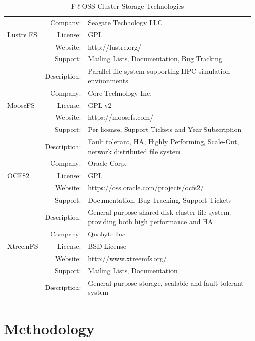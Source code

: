 \documentclass[a4paper, 12pt]{book}
\begin{document}
\begin{table}[H]
  \centering
  \begin{tabular}{ | m{2cm} | r  m{10cm} | }
 
     \hline
		& Company: & Seagate Technology LLC \\
      Lustre FS	& License: & GPL \\
		& Website: & http://lustre.org/ \\
		& Support: & Mailing Lists, Documentation, Bug Tracking \\
	 	& Description: & Parallel file system supporting HPC simulation environments \\

    \hline
		& Company: & Core Technology Inc. \\
      MooseFS	& License: & GPL v2 \\
		& Website: & https://moosefs.com/ \\
		& Support: & Per license, Support Tickets and Year Subscription\\
	 	& Description: & Fault tolerant, HA, Highly Performing, Scale-Out, network distributed file system \\

    \hline
		& Company: & Oracle Corp. \\
      	OCFS2	& License: & GPL \\
		& Website: & https://oss.oracle.com/projects/ocfs2/ \\
		& Support: & Documentation, Bug Tracking, Support Tickets \\
	 	& Description: & General-purpose shared-disk cluster file system, providing both high performance and HA \\
    \hline
		& Company: & Quobyte Inc. \\
      XtreemFS	& License: & BSD License \\
		& Website: & http://www.xtreemfs.org/ \\
		& Support: & Mailing Lists, Documentation \\
	 	& Description: & General purpose storage, scalable and fault-tolerant system \\
    \hline    
    
  \end{tabular}
\caption{F$\ell$OSS Cluster Storage Technologies}
\label{table:cluster_filesystems}
\end{table}


%
\chapter{Methodology}
\label{chap:methodology}
\end{document}
